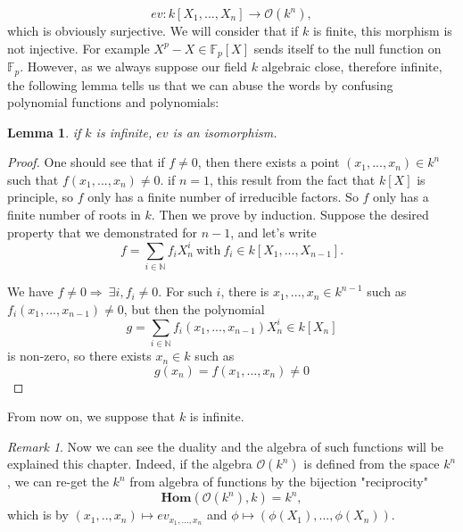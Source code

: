 \documentclass[12pt,a4paper,english]{article}
\theoremstyle{plain}
\newtheorem{lem}[thm]{Lemma}
\theoremstyle{definition}
\theoremstyle{remark}
\newtheorem*{rem}{Remark}
\newcommand{\homo}{\mathbf{Hom}}
\begin{document}
\begin{equation*}
    ev:k[X_{1},...,X_{n}]\rightarrow \mathcal{O}(k^{n}),
\end{equation*}
which is obviously surjective. We will consider that if $k$ is finite, this morphism is not injective. For example $X^{p}-X\in \mathbb{F}_{p}[X]$ sends itself to the null function on $\mathbb{F}_{p}$. However, as we always suppose our field $k$ algebraic close, therefore infinite, the following lemma tells us that we can abuse the words by confusing polynomial functions and
polynomials:
\begin{lem}
if $k $ is infinite, $ev$ is an isomorphism.
\end{lem}
\begin{proof}
One should see that if $f\not=0$, then there exists a point $(x_{1},...,x_{n})\in k^{n}$ such that $f(x_{1},...,x_{n})\not=0$. if $n=1$, this result from the fact that $k[X]$ is principle, so $f$ only has a finite number of irreducible factors. So $f$ only has a finite number of roots in $k$. Then we prove by induction. Suppose the desired property that we demonstrated for $n-1$, and let's write
\begin{equation*}
    f=\sum_{i\in\mathbb{N}}f_{i}X^{i}_{n}\ \text{with}\ f_{i}\in k[X_{1},...,X_{n-1}].
\end{equation*}

We have $f\not=0\Rightarrow\ \exists i,f_{i}\not=0 $. For such $i$, there is $x_{1},...,x_{n}\in k^{n-1}$ such as $f_{i}(x_{1},...,x_{n-1})\not=0$, but then the polynomial 
\begin{equation*}
    g=\sum_{i\in\mathbb{N}}f_{i}(x_{1},...,x_{n-1})X^{i}_{n}\in k[X_{n}]
\end{equation*}
is non-zero, so there exists $x_{n}\in k$ such as 
\begin{equation*}
    g(x_{n})=f(x_{1},...,x_{n})\not=0
\end{equation*}
\end{proof}
From now on, we suppose that $k$ is infinite.

\begin{rem}\label{rem1}
Now we can see the duality and the algebra of such functions will be explained this chapter. Indeed, if the algebra $\mathcal{O}(k^{n})$ is defined from the space $k^{n}$, we can re-get the $k^{n}$ from algebra of  functions by the bijection "reciprocity" 
\begin{equation*}
    \homo(\mathcal{O}(k^{n}),k) = k^{n},
\end{equation*}
which is by $(x_{1},..,x_{n})\mapsto ev_{x_{1},...,x_{n}}$ and $\phi\mapsto (\phi(X_{1}),...,\phi(X_{n}))$.
\end{rem}
\end{document}
